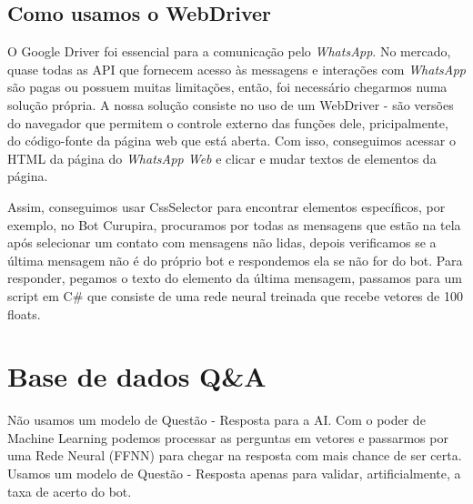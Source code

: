 \subsection{Como usamos o WebDriver}
    O Google Driver foi essencial para a comunicação pelo \textit{WhatsApp}. No mercado, quase todas as API que fornecem acesso às messagens e interações com \textit{WhatsApp} são pagas ou possuem muitas limitações, então, foi necessário chegarmos numa solução própria. A nossa solução consiste no uso de um WebDriver - são versões do navegador que permitem o controle externo das funções dele, pricipalmente, do código-fonte da página web que está aberta. Com isso, conseguimos acessar o HTML da página do \textit{WhatsApp Web} e clicar e mudar textos de elementos da página.
    
    
    Assim, conseguimos usar CssSelector para encontrar elementos específicos, por exemplo, no Bot Curupira, procuramos por todas as mensagens que estão na tela após selecionar um contato com mensagens não lidas, depois verificamos se a última mensagem não é do próprio bot e respondemos ela se não for do bot. Para responder, pegamos o texto do elemento da última mensagem, passamos para um script em C\# que consiste de uma rede neural treinada que recebe vetores de 100 floats.
\section{Base de dados Q\&A}
    Não usamos um modelo de Questão - Resposta para a AI. Com o poder de Machine Learning podemos processar as perguntas em vetores e passarmos por uma Rede Neural (FFNN) para chegar na resposta com mais chance de ser certa. Usamos um modelo de Questão - Resposta apenas para validar, artificialmente, a taxa de acerto do bot.
    
